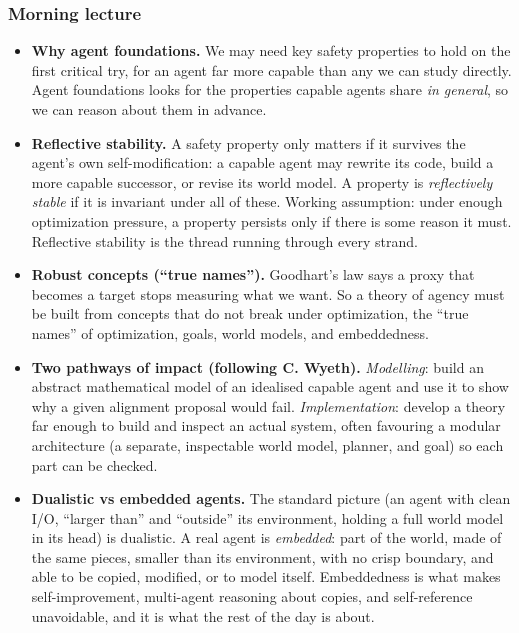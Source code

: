 \documentclass[11pt]{article}
\begin{document}
\subsubsection{Morning lecture}
\begin{itemize}
\item
  \textbf{Why agent foundations.} We may need key safety properties to hold on the first critical try, for an agent far more capable than any we can study directly. Agent foundations looks for the properties capable agents share \emph{in general}, so we can reason about them in advance.
\item
  \textbf{Reflective stability.} A safety property only matters if it survives the agent's own self-modification: a capable agent may rewrite its code, build a more capable successor, or revise its world model. A property is \emph{reflectively stable} if it is invariant under all of these. Working assumption: under enough optimization pressure, a property persists only if there is some reason it must. Reflective stability is the thread running through every strand.
\item
  \textbf{Robust concepts (``true names'').} Goodhart's law says a proxy that becomes a target stops measuring what we want. So a theory of agency must be built from concepts that do not break under optimization, the ``true names'' of optimization, goals, world models, and embeddedness.
\item
  \textbf{Two pathways of impact (following C. Wyeth).} \emph{Modelling}: build an abstract mathematical model of an idealised capable agent and use it to show why a given alignment proposal would fail. \emph{Implementation}: develop a theory far enough to build and inspect an actual system, often favouring a modular architecture (a separate, inspectable world model, planner, and goal) so each part can be checked.
\item
  \textbf{Dualistic vs embedded agents.} The standard picture (an agent with clean I/O, ``larger than'' and ``outside'' its environment, holding a full world model in its head) is dualistic. A real agent is \emph{embedded}: part of the world, made of the same pieces, smaller than its environment, with no crisp boundary, and able to be copied, modified, or to model itself. Embeddedness is what makes self-improvement, multi-agent reasoning about copies, and self-reference unavoidable, and it is what the rest of the day is about.
\end{itemize}
\end{document}
